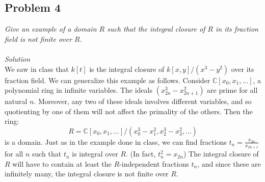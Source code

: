 \documentclass[12 pt]{article}
\newcommand{\C}{\mathbb{C}}
\begin{document}
\subsection*{Problem 4}
\emph{Give an example of a domain $R$ such that the integral closure of $R$ in its fraction field is not finite over $R$.}
\\
\\
\emph{Solution}
\\
We saw in class that $k[t]$ is the integral closure of $k[x,y]/(x^3 - y^2)$ over its fraction field. We can generalize this example as follows. Consider $\C[x_0, x_1, \dots]$, a polynomial ring in infinite variables. The ideals $(x_{2n}^3 - x_{2n+1}^2)$ are prime for all natural $n$. Moreover, any two of these ideals involves different variables, and so quotienting by one of them will not affect the primality of the others. Then the ring:
\[     R = \C[x_0, x_1, \dots] / (x_0^3 - x_1^2, x_2^3 - x_3^2 , \dots )    \]
is a domain. Just as in the example done in class, we can find fractions $t_n = \frac{x_{2n}}{x_{2n+1}}$ for all $n$ such that $t_n$ is integral over $R$. (In fact, $t_n^2 = x_{2n}$) The integral closure of $R$ will have to contain at least the $R$-independent fractions $t_n$, and since these are infinitely many, the integral closure is not finite over $R$.
\end{document}
